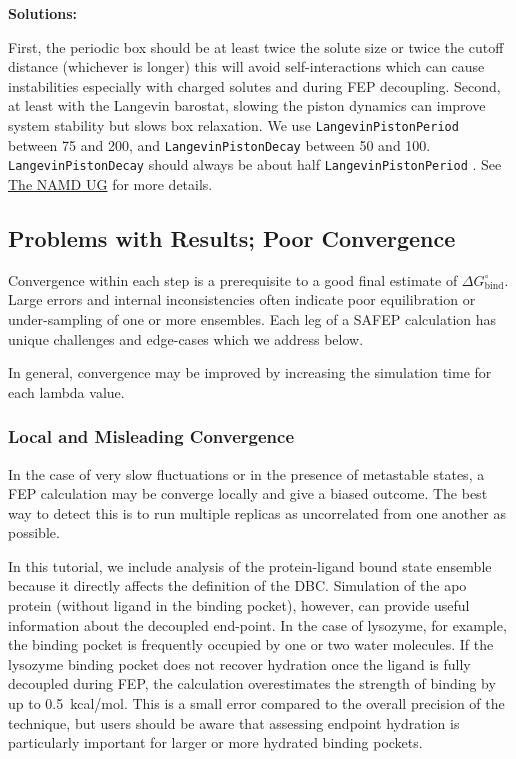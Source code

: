\documentclass[9pt,tutorial]{Styling/livecoms}
\newcommand{\textInput}[1]{
  \texttt{#1}
}
\begin{document}
\noindent\textbf{Solutions:}

First, the periodic box should be at least twice the solute size or twice the cutoff distance (whichever is longer) this will avoid self-interactions which can cause instabilities especially with charged solutes and during FEP decoupling. Second, at least with the Langevin barostat, slowing the piston dynamics can improve system stability but slows box relaxation. We use \textInput{LangevinPistonPeriod} between 75 and 200, and \textInput{LangevinPistonDecay} between 50 and 100. \textInput{LangevinPistonDecay} should always be about half \textInput{LangevinPistonPeriod}. See \href{https://www.ks.uiuc.edu/Research/namd/2.14/ug/node39.html}{The NAMD UG} for more details. \cite{Bernardi2020}





\subsection{Problems with Results; Poor Convergence}

Convergence within each step is a prerequisite to a good final estimate of $\Delta G^\circ_\mathrm{bind}$. Large errors and internal inconsistencies often indicate poor equilibration or under-sampling of one or more ensembles. Each leg of a SAFEP calculation has unique challenges and edge-cases which we address below. 

In general, convergence may be improved by increasing the simulation time for each lambda value.

\subsubsection{Local and Misleading Convergence}
In the case of very slow fluctuations or in the presence of metastable states, a FEP calculation may be converge locally and give a biased outcome.
The best way to detect this is to run multiple replicas as uncorrelated from one another as possible. 

In this tutorial, we include analysis of the protein-ligand bound state ensemble because it directly affects the definition of the DBC.
Simulation of the apo protein (without ligand in the binding pocket), however, can provide useful information about the decoupled end-point.
In the case of lysozyme, for example, the binding pocket is frequently occupied by one or two water molecules.
If the lysozyme binding pocket does not recover hydration once the ligand is fully decoupled during FEP, the calculation overestimates the strength of binding by up to 0.5~kcal/mol. This is a small error compared to the overall precision of the technique, but users should be aware that assessing endpoint hydration is particularly important for larger or more hydrated binding pockets. 
\end{document}
